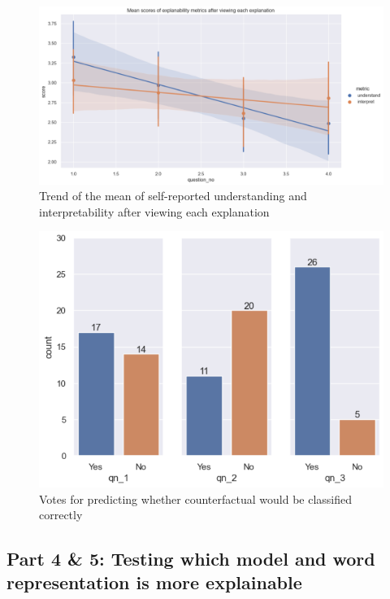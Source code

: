 \begin{figure}[!ht]
    \centering
    \includegraphics[width=1\linewidth]{figures/part3.png}
    \caption{Trend of the mean of self-reported understanding and interpretability after viewing each explanation}
    \label{fig:part3_trend}
\end{figure}

\begin{figure}[!ht]
    \centering
    \includegraphics[width=1\linewidth]{figures/part_3_counterfactual.png}
    \caption{Votes for predicting whether counterfactual would be classified correctly}
    \label{fig:part3_counterfactual}
\end{figure}


\subsection{Part 4 \& 5: Testing which model and word representation is more explainable}

